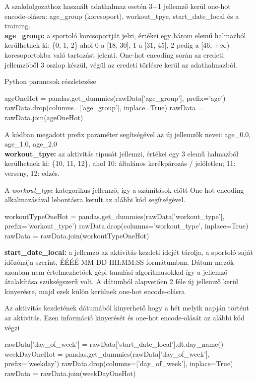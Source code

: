 A szakdolgozathoz használt adathalmaz esetén 3+1 jellemző kerül one-hot encode-olásra: age\_group (korcsoport), workout\_tpye, start\_date\_local és a training.\\[6pt]

\textbf{age\_group:} a sportoló korcsoportját jelzi, értékei egy három elemű halmazból kerülhetnek ki: \{0, 1, 2\} ahol 0 a [18, 30], 1 a [31, 45], 2 pedig a [46, $+\infty$) korcsoportokba való tartozást jelenti. One-hot encoding során az eredeti jellemzőből 3 oszlop készül, végül az eredeti törlésre kerül az adathalmazból.
\begin{programreszlet}
Python parancsok részletezése
\begin{python}
ageOneHot = pandas.get_dummies(rawData['age_group'], prefix='age')
rawData.drop(columns=['age_group'], inplace=True)
rawData = rawData.join(ageOneHot)
\end{python}
\end{programreszlet}
A kódban megadott prefix paraméter segítségével az új jellemzők nevei: age\_0.0, age\_1.0, age\_2.0\\[6pt]


\textbf{workout\_tpye:} az aktivitás típusát jellemzi, értékei egy 3 elemű halmazból kerülhetnek ki: \{10, 11, 12\}, ahol 10: általános kerékpározás / jelöletlen; 11: verseny, 12: edzés. 

\begin{programreszlet} A \textit{workout\_type} kategorikus jellemző, így a számítások előtt One-hot encoding alkalmazásával lebontásra került az alábbi kód segítségével. 
\begin{python}
workoutTypeOneHot = pandas.get_dummies(rawData['workout_type'],
				       prefix='workout_type')
rawData.drop(columns='workout_type', inplace=True)
rawData = rawData.join(workoutTypeOneHot)
\end{python}
\end{programreszlet}


\textbf{start\_date\_local:} a jellemző az aktivitás kezdeti idejét tárolja, a sportoló saját időzónája szerint, ÉÉÉÉ-MM-DD HH:MM:SS formátumban. Dátum mezők azonban nem értelmezhetőek gépi tanulási algoritmusokkal így a jellemző átalakítása szükségszerű volt. A dátumból alapvetően 2 féle új jellemző kerül kinyerésre, majd ezek külön kerülnek one-hot encode-olásra

\begin{programreszlet}
Az aktivitás kezdetének dátumából kinyerhető hogy a hét melyik napján történt az aktivitás. Ezen információ kinyerését és one-hot encode-olását az alábbi kód végzi
\begin{python}
rawData['day_of_week'] = rawData['start_date_local'].dt.day_name()
weekDayOneHot = pandas.get_dummies(rawData['day_of_week'], 
				   prefix='weekday')
rawData.drop(columns=['day_of_week'], inplace=True)
rawData = rawData.join(weekDayOneHot)
\end{python}		
\end{programreszlet}

